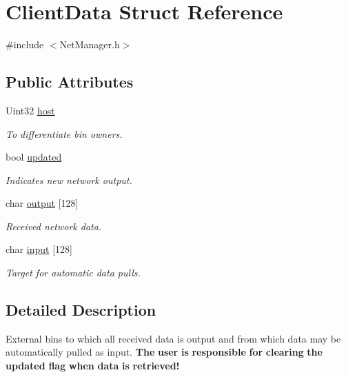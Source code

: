 \hypertarget{structClientData}{\section{Client\-Data Struct Reference}
\label{structClientData}
}


{\ttfamily \#include $<$Net\-Manager.\-h$>$}

\subsection*{Public Attributes}
\begin{DoxyCompactItemize}
\item 
Uint32 \hyperlink{structClientData_a80800ab1be736113d72ae920e2c206e5}{host}
\begin{DoxyCompactList}\small\item\em To differentiate bin owners. \end{DoxyCompactList}\item 
bool \hyperlink{structClientData_ac6a00858b77772f89feb087a87004176}{updated}
\begin{DoxyCompactList}\small\item\em Indicates new network output. \end{DoxyCompactList}\item 
char \hyperlink{structClientData_a9a56c37fe0e6a3dea909ab4efc7090b7}{output} \mbox{[}128\mbox{]}
\begin{DoxyCompactList}\small\item\em Received network data. \end{DoxyCompactList}\item 
char \hyperlink{structClientData_ac35c0f10a3464940d3cc884b384ff2f4}{input} \mbox{[}128\mbox{]}
\begin{DoxyCompactList}\small\item\em Target for automatic data pulls. \end{DoxyCompactList}\end{DoxyCompactItemize}


\subsection{Detailed Description}
External bins to which all received data is output and from which data may be automatically pulled as input. {\bfseries The} {\bfseries user} {\bfseries is} {\bfseries responsible} {\bfseries for} {\bfseries clearing} {\bfseries the} {\bfseries updated} {\bfseries flag} {\bfseries when} {\bfseries data} {\bfseries is} {\bfseries retrieved!} 

